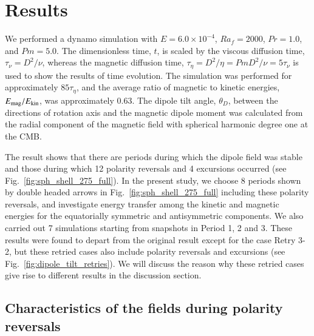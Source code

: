 \section{Results}
\label{section:results}

We performed a dynamo simulation with $E = 6.0 \times 10^{-4}$, $Ra_f = 2000$, $Pr = 1.0$, and $Pm = 5.0$. 
The dimensionless time, $t$, is scaled by the viscous diffusion time, $\tau_\nu = D^2 / \nu$, whereas the magnetic diffusion time, $\tau_\eta = D^2 / \eta = Pm D^2 / \nu = 5 \tau_\nu$ is used to show the results of time evolution.
The simulation was performed for approximately $85 \tau_\eta$, and the average ratio of magnetic to kinetic energies, $E_{\rm mag} / E_{\rm kin}$, was approximately 0.63. 
The dipole tilt angle, $\theta_D$, between the directions of rotation axis and the magnetic dipole moment was calculated from the radial component of the magnetic field with spherical harmonic degree one  at the CMB.




The result shows that there are periods during which the dipole field was stable and those during which 12 polarity reversals and 4 excursions occurred (see Fig.~\ref{fig:sph_shell_275_full}).
In the present study, we choose 8 periods shown by double headed arrows in Fig.~\ref{fig:sph_shell_275_full} including these polarity reversals, and investigate energy transfer among the kinetic and magnetic energies for the equatorially symmetric and antisymmetric components. 
We also carried out 7 simulations starting from snapshots in Period 1, 2 and 3. 
These results were found to depart from the original result except for the case Retry 3-2, but these retried cases also include polarity reversals and excursions (see Fig.~\ref{fig:dipole_tilt_retries}). 
We will discuss the reason why these retried cases give rise to different results in the discussion section.

\subsection{Characteristics of the fields during polarity reversals}

